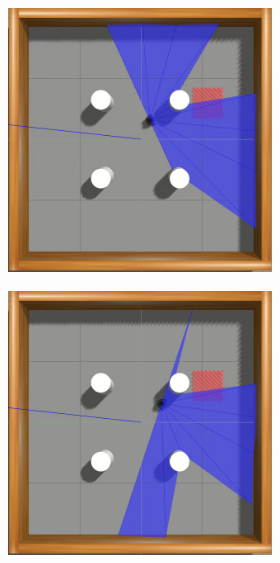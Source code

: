 \begin{figure}[H]
\begin{center}
\begin{subfigure}[b]{0.60\textwidth}
        \begin{subfigure}[b]{0.24\textwidth}
            \includegraphics[width=\textwidth]{imagens/simulated_envs/sim_env2_sac/5.png}
        \end{subfigure}
        \hfill
        \begin{subfigure}[b]{0.24\textwidth}
            \includegraphics[width=\textwidth]{imagens/simulated_envs/sim_env2_sac/6.png}

\end{subfigure}
\end{subfigure}
\end{center}
\end{figure}
